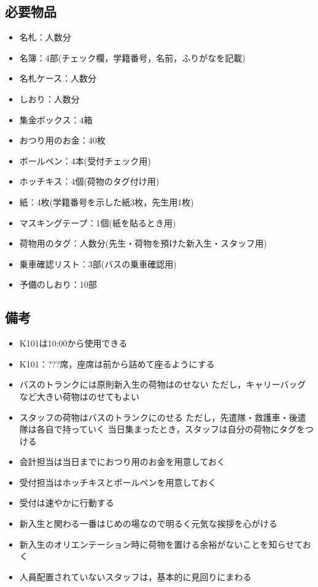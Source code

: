 


\subsection{必要物品}
\begin{itemize}
\item 名札：人数分
\item 名簿：4部(チェック欄，学籍番号，名前，ふりがなを記載)
\item 名札ケース：人数分
\item しおり：人数分
\item 集金ボックス：4箱
\item おつり用のお金：40枚
\item ボールペン：4本(受付チェック用)
\item ホッチキス：4個(荷物のタグ付け用)
\item 紙：4枚(学籍番号を示した紙3枚，先生用1枚)
\item マスキングテープ：1個(紙を貼るとき用)
\item 荷物用のタグ：人数分(先生・荷物を預けた新入生・スタッフ用)
\item 乗車確認リスト：3部(バスの乗車確認用)
\item 予備のしおり：10部
\end{itemize}


\subsection{備考}
\begin{itemize}
\item K101は10:00から使用できる
\item K101：???席，座席は前から詰めて座るようにする
\item バスのトランクには原則新入生の荷物はのせない ただし，キャリーバッグなど大きい荷物はのせてもよい
\item スタッフの荷物はバスのトランクにのせる ただし，先遣隊・救護車・後遣隊は各自で持っていく 当日集まったとき，スタッフは自分の荷物にタグをつける
\item 会計担当は当日までにおつり用のお金を用意しておく
\item 受付担当はホッチキスとボールペンを用意しておく
\item 受付は速やかに行動する
\item 新入生と関わる一番はじめの場なので明るく元気な挨拶を心がける
\item 新入生のオリエンテーション時に荷物を置ける余裕がないことを知らせておく
\item 人員配置されていないスタッフは，基本的に見回りにまわる
\end{itemize}



